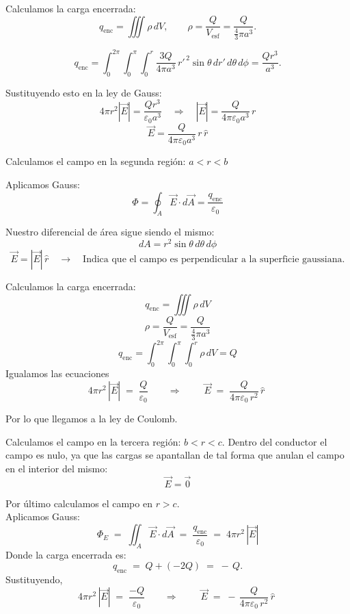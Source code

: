 \documentclass[a4paper,12pt]{article}
\begin{document}
\noindent
Calculamos la carga encerrada:
\[
q_{\text{enc}}=\iiint \rho\, dV,
\qquad
\rho=\frac{Q}{V_{\text{esf}}}=\frac{Q}{\frac{4}{3}\pi a^{3}}.
\]

\[
q_{\text{enc}}
=\int_{0}^{2\pi}\!\!\int_{0}^{\pi}\!\!\int_{0}^{r}
\frac{3Q}{4\pi a^{3}}\,r'^{\,2}\sin\theta \, dr'\, d\theta\, d\phi
=\frac{Q r^{3}}{a^{3}}.
\]

\medskip
\noindent
Sustituyendo esto en la ley de Gauss:
\[
4\pi r^{2} |\vec E| = \frac{Q r^{3}}{\varepsilon_0 a^{3}} 
\quad \Rightarrow \quad 
|\vec E| = \frac{Q}{4\pi \varepsilon_0 a^{3}}\, r
\]
\[
\vec E = \frac{Q}{4\pi \varepsilon_0 a^{3}}\, r\, \hat r
\]

\medskip
\noindent
Calculamos el campo en la segunda región: \( a < r < b \)

\medskip
\noindent
Aplicamos Gauss:
\[
\Phi = \oint_{A} \vec E \cdot d\vec A = \frac{q_{\text{enc}}}{\varepsilon_0}
\]

\noindent
Nuestro diferencial de área sigue siendo el mismo:
\[
dA = r^{2} \sin\theta\, d\theta\, d\phi
\]
\[
\vec E = |\vec E| \, \hat r 
\quad \rightarrow \quad \text{Indica que el campo es perpendicular a la superficie gaussiana.}
\]

\medskip
\noindent
Calculamos la carga encerrada:
\[
q_{\text{enc}} = \iiint \rho\, dV
\]
\[
\rho = \frac{Q}{V_{\text{esf}}} = \frac{Q}{\frac{4}{3}\pi a^{3}}
\]
\[
q_{\text{enc}} = \int_{0}^{2\pi}\!\!\int_{0}^{\pi}\!\!\int_{0}^{r} \rho\, dV = Q
\]
\newpage
\medskip
\noindent
Igualamos las ecuaciones
\[
4\pi r^{2}\,|\vec E| \;=\; \frac{Q}{\varepsilon_{0}}
\qquad\Longrightarrow\qquad
\boxed{\; \vec E \;=\; \frac{Q}{4\pi \varepsilon_{0}\,r^{2}}\,\hat r \;}
\]

\medskip
\noindent
Por lo que llegamos a la ley de Coulomb.

\medskip
\noindent
Calculamos el campo en la tercera región: \(b<r<c\).
Dentro del conductor el campo es nulo, ya que las cargas se apantallan de tal forma
que anulan el campo en el interior del mismo:
\[
\boxed{\; \vec E = \vec 0 \;}
\]

\medskip
\noindent
Por último calculamos el campo en \(r>c\).\\
Aplicamos Gauss:
\[
\Phi_E \;=\; \iint_{A} \vec E\!\cdot d\vec A
\;=\; \frac{q_{\text{enc}}}{\varepsilon_{0}}
\;=\; 4\pi r^{2}\,|\vec E|
\]
Donde la carga encerrada es:
\[
q_{\text{enc}} \;=\; Q + (-2Q) \;=\; -\,Q .
\]
Sustituyendo,
\[
4\pi r^{2}\,|\vec E| \;=\; \frac{-Q}{\varepsilon_{0}}
\qquad\Longrightarrow\qquad
\boxed{\; \vec E \;=\; -\,\frac{Q}{4\pi \varepsilon_{0}\,r^{2}}\,\hat r \;}
\]
\end{document}
